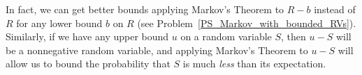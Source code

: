 In fact, we can get better bounds applying Markov's Theorem to $R-b$
instead of $R$ for any lower bound $b$ on $R$ (see
Problem~\ref{PS_Markov_with_bounded_RVs}).  Similarly, if we have any
upper bound $u$ on a random variable $S$, then $u-S$ will be a
nonnegative random variable, and applying Markov's Theorem to $u-S$
will allow us to bound the probability that $S$ is much \emph{less}
than its expectation.

\iffalse
Suppose we know that $R \geq \ell$, then can we do better?
Let $T=R-\ell$.  Note that $T \geq 0$.  So, we can use Markov's
Theorem on $T$, to say that 
\begin{eqnarray*}
\pr{R  \geq x }   & = &   \pr{T \geq x -\ell} 
  \leq 
  \frac{\expect{T}}{x -\ell} 
  =   \frac{\expect{R - \ell}}{x - \ell}
  =   \frac{\expect{R} - \ell}{x - \ell} \\
\end{eqnarray*}
This gives a somewhat better bound on the probability that
$R$ goes crazy!  
\fi

